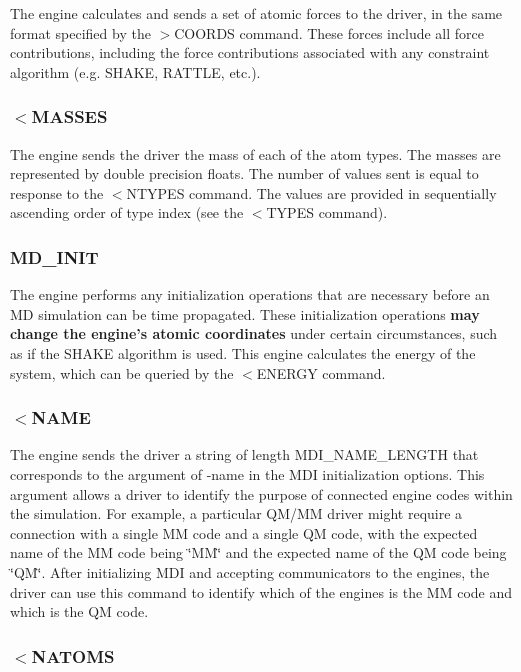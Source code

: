 The engine calculates and sends a set of atomic forces to the driver, in the same format specified by the {\ttfamily $>$C\-O\-O\-R\-D\-S} command. These forces include all force contributions, including the force contributions associated with any constraint algorithm (e.\-g. S\-H\-A\-K\-E, R\-A\-T\-T\-L\-E, etc.).\hypertarget{index_recv_masses}{}\subsubsection{$<$\-M\-A\-S\-S\-E\-S}\label{index_recv_masses}
The engine sends the driver the mass of each of the atom types. The masses are represented by double precision floats. The number of values sent is equal to response to the $<$N\-T\-Y\-P\-E\-S command. The values are provided in sequentially ascending order of type index (see the {\ttfamily $<$T\-Y\-P\-E\-S} command).\hypertarget{index_md_init}{}\subsubsection{M\-D\-\_\-\-I\-N\-I\-T}\label{index_md_init}
The engine performs any initialization operations that are necessary before an M\-D simulation can be time propagated. These initialization operations {\bfseries  may change the engine's atomic coordinates } under certain circumstances, such as if the S\-H\-A\-K\-E algorithm is used. This engine calculates the energy of the system, which can be queried by the {\ttfamily $<$E\-N\-E\-R\-G\-Y} command.\hypertarget{index_send_name}{}\subsubsection{$<$\-N\-A\-M\-E}\label{index_send_name}
The engine sends the driver a string of length {\ttfamily M\-D\-I\-\_\-\-N\-A\-M\-E\-\_\-\-L\-E\-N\-G\-T\-H} that corresponds to the argument of {\ttfamily -\/name} in the M\-D\-I initialization options. This argument allows a driver to identify the purpose of connected engine codes within the simulation. For example, a particular Q\-M/\-M\-M driver might require a connection with a single M\-M code and a single Q\-M code, with the expected name of the M\-M code being \char`\"{}\-M\-M\char`\"{} and the expected name of the Q\-M code being \char`\"{}\-Q\-M\char`\"{}. After initializing M\-D\-I and accepting communicators to the engines, the driver can use this command to identify which of the engines is the M\-M code and which is the Q\-M code.\hypertarget{index_recv_natoms}{}\subsubsection{$<$\-N\-A\-T\-O\-M\-S}\label{index_recv_natoms}
